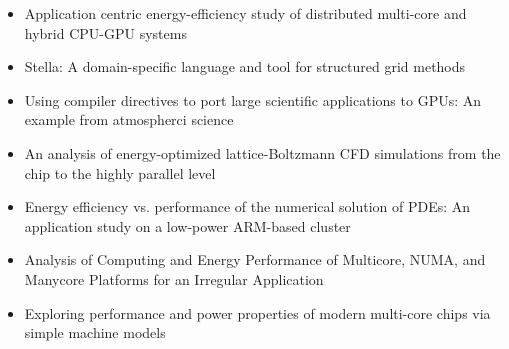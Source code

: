 \begin{itemize}
\item Application centric energy-efficiency study of distributed
  multi-core and hybrid {CPU-GPU} systems \citep{Cumming-2014}
\item Stella: A domain-specific language and tool for structured grid
  methods \citep{Gysi-2014}
\item Using compiler directives to port large scientific applications
  to GPUs: An example from atmospherci science \citep{Lapillonne-2014}
\item An analysis of energy-optimized lattice-Boltzmann CFD
  simulations from the chip to the highly parallel level
  \citep{Wittmann-2013}
\item Energy efficiency vs. performance of the numerical solution of
  PDEs: An application study on a low-power ARM-based cluster
  \citep{Goddeke-2013}
\item Analysis of Computing and Energy Performance of Multicore, NUMA,
  and Manycore Platforms for an Irregular Application
  \citep{Castro-2013}
\item Exploring performance and power properties of modern multi-core
  chips via simple machine models \citep{Hager-2013}
\end{itemize}

